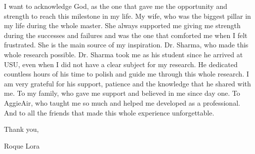 %
%
%
%
%

\begin{acknowledgments} 

I want to acknowledge God, as the one that gave me the opportunity and strength to reach this milestone in my life. My wife, who was the biggest pillar in my life during the whole master. She always supported me giving me strength during the successes and failures and was the one that comforted me when I felt frustrated. She is the main source of my inspiration. Dr. Sharma, who made this whole research possible. Dr. Sharma took me as his student since he arrived at USU, even when I did not have a clear subject for my research. He dedicated countless hours of his time to polish and guide me through this whole research. I am very grateful for his support, patience and the knowledge that he shared with me. To my family, who gave me support and believed in me since day one. To AggieAir, who taught me so much and helped me developed as a professional. And to all the friends that made this whole experience unforgettable.

\bigskip

Thank you,

\begin{flushright} 
	Roque Lora 
\end{flushright}

\end{acknowledgments}

